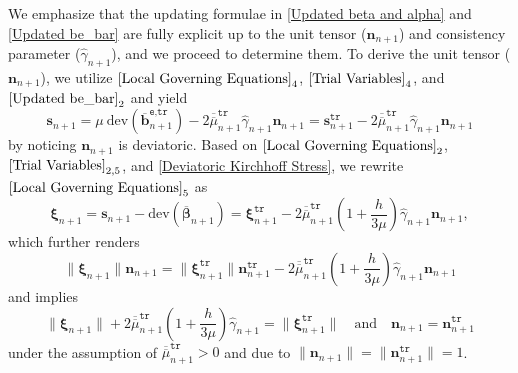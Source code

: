 \documentclass[preprint,11pt]{elsarticle}
\theoremstyle{definition}
\begin{document}
We emphasize that the updating formulae in \eqref{Updated beta and alpha} and \eqref{Updated be_bar} are fully explicit up to the unit tensor ($\mathbf{n}_{n+1}$) and consistency parameter ($\widehat{\gamma}_{n+1}$), and we proceed to determine them. To derive the unit tensor ($\mathbf{n}_{n+1}$), we utilize $\eqref{Local Governing Equations}_4$, $\eqref{Trial Variables}_4$, and $\eqref{Updated be_bar}_2$ and yield
\begin{equation} \label{Deviatoric Kirchhoff Stress}
    \mathbf{s}_{n+1} = \mu\ \text{dev}(\overline{\mathbf{b}}_{n+1}^\texttt{e,tr})
    - 2 \overline{\overline{\mu}}_{n+1}^\texttt{tr} \widehat{\gamma}_{n+1} \mathbf{n}_{n+1}
    = \mathbf{s}_{n+1}^\texttt{tr}
    - 2 \overline{\overline{\mu}}_{n+1}^\texttt{tr} \widehat{\gamma}_{n+1} \mathbf{n}_{n+1}
\end{equation}
by noticing $\mathbf{n}_{n+1}$ is deviatoric. Based on $\eqref{Local Governing Equations}_2$, $\eqref{Trial Variables}_{2,5}$, and \eqref{Deviatoric Kirchhoff Stress}, we rewrite $\eqref{Local Governing Equations}_5$ as
\begin{equation*}
    \boldsymbol{\xi}_{n+1} = \mathbf{s}_{n+1} - \text{dev} \left( \overline{\boldsymbol{\beta}}_{n+1} \right)
    = \boldsymbol{\xi}_{n+1}^\texttt{tr}
    - 2 \overline{\overline{\mu}}_{n+1}^\texttt{tr}
    \left( 1 + \dfrac{h}{3\mu} \right) \widehat{\gamma}_{n+1} \mathbf{n}_{n+1},
\end{equation*}
which further renders
\begin{equation*}
    \lVert \boldsymbol{\xi}_{n+1} \rVert \mathbf{n}_{n+1}
    = \lVert \boldsymbol{\xi}_{n+1}^\texttt{tr} \rVert \mathbf{n}_{n+1}^\texttt{tr}
    - 2 \overline{\overline{\mu}}_{n+1}^\texttt{tr}
    \left( 1 + \dfrac{h}{3\mu} \right) \widehat{\gamma}_{n+1} \mathbf{n}_{n+1}
\end{equation*}
and implies
\begin{equation} \label{Relationship between xi and xi_trial}
    \lVert \boldsymbol{\xi}_{n+1} \rVert
    + 2 \overline{\overline{\mu}}_{n+1}^\texttt{tr}
    \left( 1 + \dfrac{h}{3\mu} \right) \widehat{\gamma}_{n+1}
    = \lVert \boldsymbol{\xi}_{n+1}^\texttt{tr} \rVert
    \quad \text{and} \quad
    \mathbf{n}_{n+1} = \mathbf{n}_{n+1}^\texttt{tr}
\end{equation}
under the assumption of $\overline{\overline{\mu}}_{n+1}^\texttt{tr} > 0$ and due to $\lVert \mathbf{n}_{n+1} \rVert = \lVert \mathbf{n}_{n+1}^\texttt{tr} \rVert = 1$.
\end{document}
